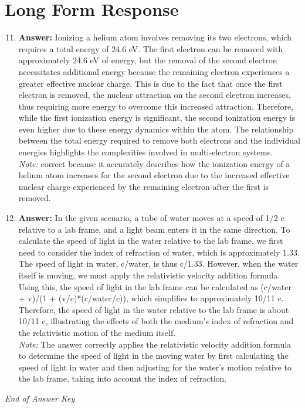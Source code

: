 \documentclass[12pt]{article}
\begin{document}
\section*{Long Form Response}
\begin{enumerate}[label=\arabic*.]
\setcounter{enumi}{10}
\item \textbf{Answer:} Ionizing a helium atom involves removing its two electrons, which requires a total energy of 24.6 eV. The first electron can be removed with approximately 24.6 eV of energy, but the removal of the second electron necessitates additional energy because the remaining electron experiences a greater effective nuclear charge. This is due to the fact that once the first electron is removed, the nuclear attraction on the second electron increases, thus requiring more energy to overcome this increased attraction. Therefore, while the first ionization energy is significant, the second ionization energy is even higher due to these energy dynamics within the atom. The relationship between the total energy required to remove both electrons and the individual energies highlights the complexities involved in multi-electron systems.
\\ \textit{Note:} correct because it accurately describes how the ionization energy of a helium atom increases for the second electron due to the increased effective nuclear charge experienced by the remaining electron after the first is removed.
\item \textbf{Answer:} In the given scenario, a tube of water moves at a speed of 1/2 c relative to a lab frame, and a light beam enters it in the same direction. To calculate the speed of light in the water relative to the lab frame, we first need to consider the index of refraction of water, which is approximately 1.33. The speed of light in water, c/water, is thus c/1.33. However, when the water itself is moving, we must apply the relativistic velocity addition formula. Using this, the speed of light in the lab frame can be calculated as (c/water + v)/(1 + (v/c)*(c/water/c)), which simplifies to approximately 10/11 c. Therefore, the speed of light in the water relative to the lab frame is about 10/11 c, illustrating the effects of both the medium's index of refraction and the relativistic motion of the medium itself.
\\ \textit{Note:} The answer correctly applies the relativistic velocity addition formula to determine the speed of light in the moving water by first calculating the speed of light in water and then adjusting for the water's motion relative to the lab frame, taking into account the index of refraction.
\end{enumerate}

\vfill
\noindent\textit{End of Answer Key}
\end{document}
